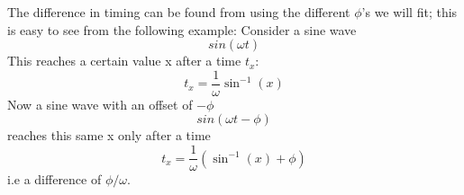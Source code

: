 \documentclass[11pt,a4paper,faculty=we,language=en,doctype=report]{cls/ugent-doc}
\begin{document}
The difference in timing can be found from using the different $\phi$'s we will fit;
this is easy to see from the following example: Consider a sine wave 
\begin{equation}
  sin(\omega t)
\end{equation}
This reaches a certain value x after a time $t_x$:
\begin{equation}
  t_x = \frac{1}{\omega}\sin^{-1}(x)
\end{equation}
Now a sine wave with an offset of $-\phi$ 
\begin{equation}
  sin(\omega t - \phi)
\end{equation}
reaches this same x only after a time
\begin{equation}
  t_x = \frac{1}{\omega}\left(\sin^{-1}(x) + \phi\right)
\end{equation}
i.e a difference of $\phi/\omega$. 
\end{document}

